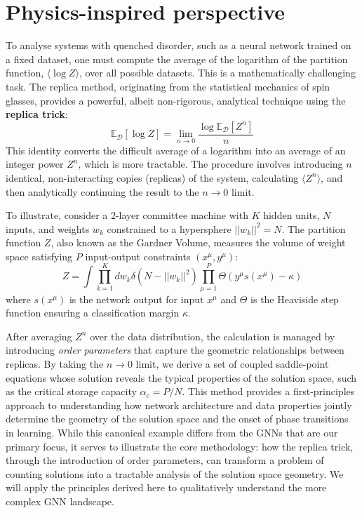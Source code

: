 \documentclass[10pt,oneside,oldfontcommands,dvipsnames,article]{memoir}
\begin{document}
\section{Physics-inspired perspective}
To analyse systems with quenched disorder, such as a neural network trained on a fixed dataset, one must compute the average of the logarithm of the partition function, $\langle\log Z\rangle$, over all possible datasets. This is a mathematically challenging task. The replica method, originating from the statistical mechanics of spin glasses, provides a powerful, albeit non-rigorous, analytical technique using the \textbf{replica trick}:
\begin{equation}
    \mathbb{E}_{\mathcal{D}}[\log Z] = \lim_{n \to 0} \frac{\log \mathbb{E}_{\mathcal{D}}[Z^n]}{n}
\end{equation}
This identity converts the difficult average of a logarithm into an average of an integer power $Z^n$, which is more tractable. The procedure involves introducing $n$ identical, non-interacting copies (replicas) of the system, calculating $\langle Z^n \rangle$, and then analytically continuing the result to the $n \to 0$ limit.

To illustrate, consider a 2-layer committee machine with $K$ hidden units, $N$ inputs, and weights $w_k$ constrained to a hypersphere $||w_k||^2 = N$. The partition function $Z$, also known as the Gardner Volume, measures the volume of weight space satisfying $P$ input-output constraints $(x^\mu, y^\mu)$:
\begin{equation}
    Z = \int \prod_{k=1}^{K} dw_k \delta(N - ||w_k||^2) \prod_{\mu=1}^{P} \Theta(y^\mu s(x^\mu) - \kappa)
\end{equation}
where $s(x^\mu)$ is the network output for input $x^\mu$ and $\Theta$ is the Heaviside step function ensuring a classification margin $\kappa$.

After averaging $Z^n$ over the data distribution, the calculation is managed by introducing \textit{order parameters} that capture the geometric relationships between replicas. By taking the $n \to 0$ limit, we derive a set of coupled saddle-point equations whose solution reveals the typical properties of the solution space, such as the critical storage capacity $\alpha_c = P/N$. This method provides a first-principles approach to understanding how network architecture and data properties jointly determine the geometry of the solution space and the onset of phase transitions in learning. While this canonical example differs from the GNNs that are our primary focus, it serves to illustrate the core methodology: how the replica trick, through the introduction of order parameters, can transform a problem of counting solutions into a tractable analysis of the solution space geometry. We will apply the principles derived here to qualitatively understand the more complex GNN landscape.
\end{document}
